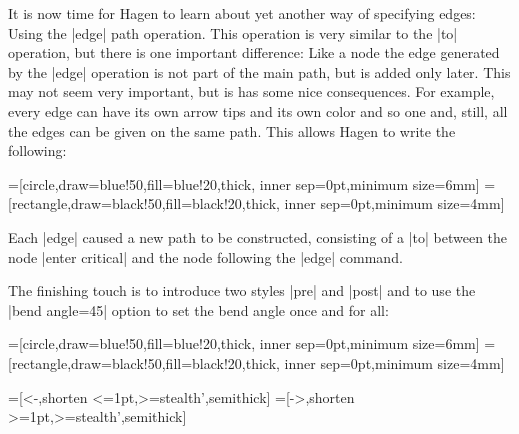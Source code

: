 It is now time for Hagen to learn about yet another way of specifying
edges: Using the |edge| path operation. This operation is very similar
to the |to| operation, but there is one important difference: Like a
node the edge generated by the |edge| operation is not part of the
main path, but is added only later. This may not seem very important,
but is has some nice consequences. For example, every edge can have
its own arrow tips and its own color and so one and, still, all the
edges can be given on the same path. This allows Hagen to write the
following: 


{
=[circle,draw=blue!50,fill=blue!20,thick,
                   inner sep=0pt,minimum size=6mm]
=[rectangle,draw=black!50,fill=black!20,thick,
                        inner sep=0pt,minimum size=4mm]
\begin{codeexample}[]
\end{codeexample}
}

Each |edge| caused a new path to be constructed, consisting of a |to|
between the node |enter critical| and the node following the |edge|
command.

The finishing touch is to introduce two styles |pre| and |post| and to
use the |bend angle=45| option to set the bend angle once and for all:

{
=[circle,draw=blue!50,fill=blue!20,thick,
                   inner sep=0pt,minimum size=6mm]
=[rectangle,draw=black!50,fill=black!20,thick,
                        inner sep=0pt,minimum size=4mm]
\begin{codeexample}[]
=[<-,shorten <=1pt,>=stealth',semithick]  
=[->,shorten >=1pt,>=stealth',semithick]  
\end{codeexample}
}



